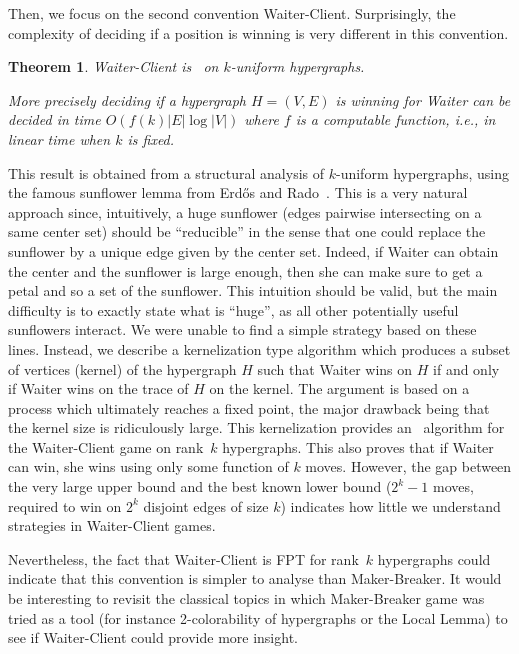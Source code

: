 \documentclass{article}
\newcommand{\hedge}{edge\xspace}
\newcommand{\hedges}{edges\xspace}
\newtheorem{theorem}{Theorem}
\begin{document}
\medskip

Then, we focus on the second convention Waiter-Client. Surprisingly, the complexity of deciding if a position is winning is very different in this convention. 

\begin{theorem}\label{th:FPT}
    Waiter-Client is \FPT\ on $k$-uniform hypergraphs. 
    
    More precisely deciding if a hypergraph \(H=(V,E)\) is winning for Waiter can be decided in time \(O(f(k) \lvert E \rvert \log \lvert V \rvert)\) where \(f\) is a computable function, i.e., in linear time when \(k\) is fixed.
\end{theorem}


This result is obtained from a structural analysis of $k$-uniform hypergraphs, using the famous sunflower lemma from Erd\H os and Rado~\cite{ER60}. This is a very natural approach since, intuitively, a huge sunflower (\hedges pairwise intersecting on a same center set) should be ``reducible'' in the sense that one could replace the sunflower by a unique \hedge given by the center set. Indeed, if Waiter can obtain the center and the sunflower is large enough, then she can make sure to get a petal and so a set of the sunflower. This intuition should be valid, but the main difficulty is to exactly state what is ``huge'', as all other potentially useful sunflowers interact. We were unable to find a simple strategy based on these lines.
Instead, we describe a kernelization type algorithm which produces a subset of vertices (kernel) of the hypergraph $H$ such that Waiter wins on $H$ if and only if Waiter wins on the trace of $H$ on the kernel. The argument is based on a process which ultimately reaches a fixed point, the major drawback being that the kernel size is ridiculously large. 
This kernelization provides an \FPT\ algorithm for the Waiter-Client game on rank~$k$ hypergraphs. This also proves that if Waiter can win, she wins using only some function of $k$ moves. However, the gap between the very large upper bound and the best known lower bound ($2^k-1$ moves, required to win on $2^k$ disjoint \hedges of size $k$) indicates how little we understand strategies in Waiter-Client games.

Nevertheless, the fact that Waiter-Client is FPT for rank~$k$ hypergraphs could indicate that this convention is simpler to analyse than Maker-Breaker. It would be interesting to revisit the classical topics in which Maker-Breaker game was tried as a tool (for instance 2-colorability of hypergraphs or the Local Lemma) to see if Waiter-Client could provide more insight.
\end{document}
